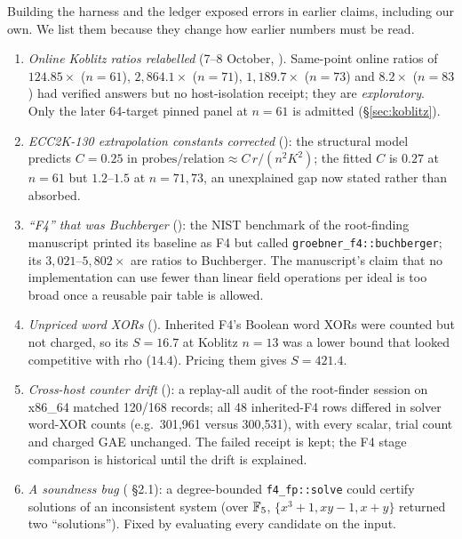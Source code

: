 Building the harness and the ledger exposed errors in earlier claims,
including our own. We list them because they change how earlier numbers
must be read.
\begin{enumerate}
\item \emph{Online Koblitz ratios relabelled} (7--8 October,
  ). Same-point online
  ratios of $124.85\times$ ($n=61$), $2{,}864.1\times$ ($n=71$),
  $1{,}189.7\times$ ($n=73$) and $8.2\times$ ($n=83$) had verified answers
  but no host-isolation receipt; they are \emph{exploratory}. Only the
  later 64-target pinned panel at $n=61$ is admitted (\S\ref{sec:koblitz}).
\item \emph{ECC2K-130 extrapolation constants corrected}
  (): the structural model
  predicts $C=0.25$ in $\text{probes/relation}\approx C\,r/(n^2K^2)$; the
  fitted $C$ is $0.27$ at $n=61$ but $1.2$--$1.5$ at $n=71,73$, an
  unexplained gap now stated rather than absorbed.
\item \emph{``F4'' that was Buchberger}
  (): the
  NIST benchmark of the root-finding manuscript printed its baseline as F4
  but called \texttt{groebner\_f4::buchberger}; its $3{,}021$--$5{,}802\times$
  are ratios to Buchberger. The manuscript's claim that no implementation
  can use fewer than linear field operations per ideal is too broad once a
  reusable pair table is allowed.
\item \emph{Unpriced word XORs} ().
  Inherited F4's Boolean word XORs were counted but not charged, so its
  $S=16.7$ at Koblitz $n=13$ was a lower bound that looked competitive
  with rho ($14.4$). Pricing them gives $S=421.4$.
\item \emph{Cross-host counter drift}
  (): a replay-all audit
  of the root-finder session on x86\_64 matched 120/168 records; all 48
  inherited-F4 rows differed in solver word-XOR counts (e.g.\ 301{,}961
  versus 300{,}531), with every scalar, trial count and charged GAE
  unchanged. The failed receipt is kept; the F4 stage comparison is
  historical until the drift is explained.
\item \emph{A soundness bug} (
  \S2.1): a degree-bounded \texttt{f4\_fp::solve} could certify solutions
  of an inconsistent system (over $\mathbb{F}_5$, $\{x^3+1,xy-1,x+y\}$ returned
  two ``solutions''). Fixed by evaluating every candidate on the input.

\end{enumerate}
